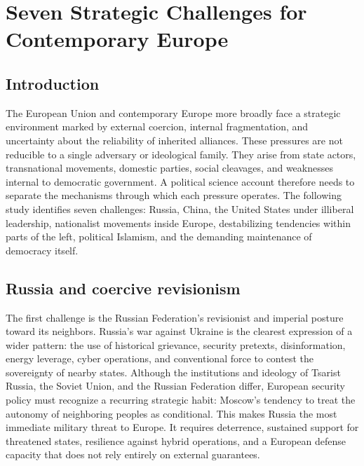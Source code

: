 \chapter{Seven Strategic Challenges for Contemporary Europe}

\begingroup

\begin{abstract}
	This article develops a concise typology of seven strategic challenges facing the European Union and the wider European political order. It treats these challenges not as identical threats, but as pressures operating through different mechanisms: military coercion, economic dependency, alliance volatility, domestic nationalism, illiberal currents within the left, religiously framed political radicalism, and the fragility of democratic governance itself. The argument is that Europe's survival as a liberal democratic project depends on its capacity to distinguish among these pressures while strengthening its own institutional, military, economic, and civic resilience.
\end{abstract}

\section{Introduction}

The European Union and contemporary Europe more broadly face a strategic environment marked by external coercion, internal fragmentation, and uncertainty about the reliability of inherited alliances. These pressures are not reducible to a single adversary or ideological family. They arise from state actors, transnational movements, domestic parties, social cleavages, and weaknesses internal to democratic government. A political science account therefore needs to separate the mechanisms through which each pressure operates. The following study identifies seven challenges: Russia, China, the United States under illiberal leadership, nationalist movements inside Europe, destabilizing tendencies within parts of the left, political Islamism, and the demanding maintenance of democracy itself.

\section{Russia and coercive revisionism}

The first challenge is the Russian Federation's revisionist and imperial posture toward its neighbors. Russia's war against Ukraine is the clearest expression of a wider pattern: the use of historical grievance, security pretexts, disinformation, energy leverage, cyber operations, and conventional force to contest the sovereignty of nearby states. Although the institutions and ideology of Tsarist Russia, the Soviet Union, and the Russian Federation differ, European security policy must recognize a recurring strategic habit: Moscow's tendency to treat the autonomy of neighboring peoples as conditional. This makes Russia the most immediate military threat to Europe. It requires deterrence, sustained support for threatened states, resilience against hybrid operations, and a European defense capacity that does not rely entirely on external guarantees.

